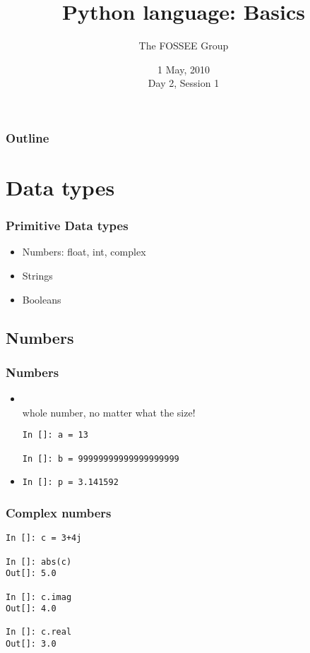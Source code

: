 \documentclass[14pt,compress]{beamer}
\title[Basic Python]{Python language: Basics}
\author[FOSSEE Team] {The FOSSEE Group}
\institute[IIT Bombay] {Department of Aerospace Engineering\\IIT Bombay}
\date[] {1 May, 2010\\Day 2, Session 1}
\newcommand{\kwrd}[1]{ \texttt{\textbf{\color{blue}{#1}}}  }
\begin{document}
\begin{frame}
  \titlepage
\end{frame}

\begin{frame}
  \frametitle{Outline}
  \tableofcontents
\end{frame}

\section{Data types}

\begin{frame}
  \frametitle{Primitive Data types}
  \begin{itemize}
    \item Numbers: float, int, complex
    \item Strings
    \item Booleans
  \end{itemize}
\end{frame}

\subsection{Numbers}
\begin{frame}[fragile]
  \frametitle{Numbers}
  \begin{itemize}
    \item \kwrd{int}\\ whole number, no matter what the size!
  \begin{lstlisting}
In []: a = 13

In []: b = 99999999999999999999
  \end{lstlisting}
    \item \kwrd{float}
  \begin{lstlisting}
In []: p = 3.141592
  \end{lstlisting}
  \end{itemize}
\end{frame}

\begin{frame}[fragile]
\frametitle{Complex numbers}
  \begin{lstlisting}
In []: c = 3+4j

In []: abs(c)
Out[]: 5.0

In []: c.imag
Out[]: 4.0

In []: c.real
Out[]: 3.0
  \end{lstlisting}
\end{frame}
\end{document}
